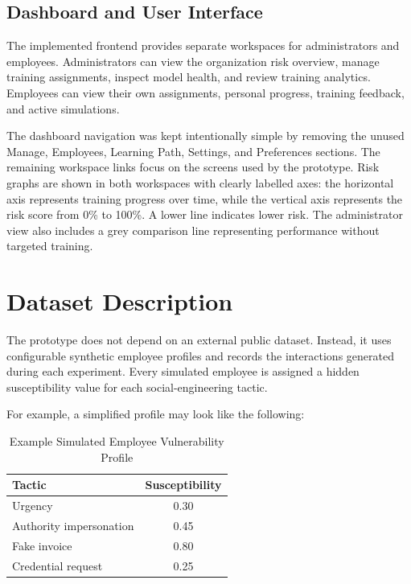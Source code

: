\documentclass[12pt,a4paper]{article}
\begin{document}
\subsection{Dashboard and User Interface}

The implemented frontend provides separate workspaces for administrators
and employees. Administrators can view the organization risk overview,
manage training assignments, inspect model health, and review training
analytics. Employees can view their own assignments, personal progress,
training feedback, and active simulations.

The dashboard navigation was kept intentionally simple by removing the
unused Manage, Employees, Learning Path, Settings, and Preferences
sections. The remaining workspace links focus on the screens used by the
prototype. Risk graphs are shown in both workspaces with clearly labelled
axes: the horizontal axis represents training progress over time, while
the vertical axis represents the risk score from 0\% to 100\%. A lower
line indicates lower risk. The administrator view also includes a grey
comparison line representing performance without targeted training.



\section{Dataset Description}

The prototype does not depend on an external public dataset. Instead,
it uses configurable synthetic employee profiles and records the
interactions generated during each experiment. Every simulated employee
is assigned a hidden susceptibility value for each social-engineering
tactic.

For example, a simplified profile may look like the following:

\begin{table}[H]
\centering
\caption{Example Simulated Employee Vulnerability Profile}
\label{tab:employeeprofile}

\begin{tabular}{lc}
\toprule
\textbf{Tactic} & \textbf{Susceptibility} \\
\midrule
Urgency & 0.30 \\
Authority impersonation & 0.45 \\
Fake invoice & 0.80 \\
Credential request & 0.25 \\
\bottomrule
\end{tabular}

\end{table}
\end{document}
